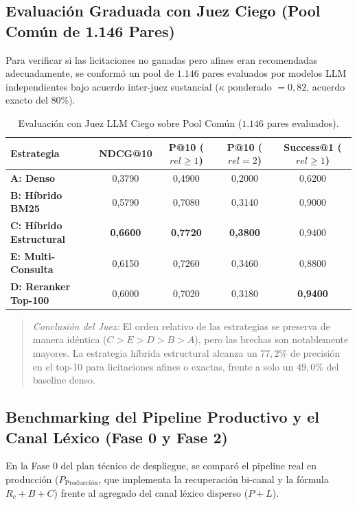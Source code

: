 \documentclass[11pt,a4paper]{article}
\begin{document}
\subsection{Evaluación Graduada con Juez Ciego (Pool Común de 1.146 Pares)}
Para verificar si las licitaciones no ganadas pero afines eran recomendadas adecuadamente, se conformó un pool de $1.146$ pares evaluados por modelos LLM independientes bajo acuerdo inter-juez sustancial ($\kappa$ ponderado $= 0{,}82$, acuerdo exacto del $80\%$).

\begin{table}[htbp]
\centering
\small
\caption{Evaluación con Juez LLM Ciego sobre Pool Común ($1.146$ pares evaluados).}
\label{tab:juez_llm}
\begin{tabularx}{\textwidth}{lcccc}
\toprule
\textbf{Estrategia} & \textbf{NDCG@10} & \textbf{P@10 ($rel \ge 1$)} & \textbf{P@10 ($rel = 2$)} & \textbf{Success@1 ($rel \ge 1$)} \\
\midrule
\textbf{A: Denso} & 0{,}3790 & 0{,}4900 & 0{,}2000 & 0{,}6200 \\
\textbf{B: Híbrido BM25} & 0{,}5790 & 0{,}7080 & 0{,}3140 & 0{,}9000 \\
\textbf{C: Híbrido Estructural} & \textbf{0{,}6600} & \textbf{0{,}7720} & \textbf{0{,}3800} & 0{,}9400 \\
\textbf{E: Multi-Consulta} & 0{,}6150 & 0{,}7260 & 0{,}3460 & 0{,}8800 \\
\textbf{D: Reranker Top-100} & 0{,}6000 & 0{,}7020 & 0{,}3180 & \textbf{0{,}9400} \\
\bottomrule
\end{tabularx}
\end{table}

\begin{quote}
\textit{Conclusión del Juez:} El orden relativo de las estrategias se preserva de manera idéntica ($C > E > D > B > A$), pero las brechas son notablemente mayores. La estrategia híbrida estructural alcanza un $77{,}2\%$ de precisión en el top-10 para licitaciones afines o exactas, frente a solo un $49{,}0\%$ del baseline denso.
\end{quote}

\subsection{Benchmarking del Pipeline Productivo y el Canal Léxico (Fase 0 y Fase 2)}
En la Fase 0 del plan técnico de despliegue, se comparó el pipeline real en producción ($P_{\text{Producción}}$, que implementa la recuperación bi-canal y la fórmula $R_c + B + C$) frente al agregado del canal léxico disperso ($P+L$).
\end{document}
